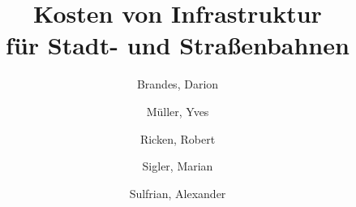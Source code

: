 \documentclass[oneside,a4paper,11pt,german]{article}
\title{Kosten von Infrastruktur \\ für Stadt- und Straßenbahnen}
\author{
  Brandes, Darion \and
  Müller, Yves \and
  Ricken, Robert \and
  Sigler, Marian \and
  Sulfrian, Alexander
}
\begin{document}
\maketitle

\begin{comment}
Gliederung:

Einleitung
* Definitionen: Kein EBO, Trennung U-Bahn/Straßenbahn (Tunnel vs. nein)

Untersuchte Projekte (Vorstellung des Projekts, Zahlen)
* U-Bahnen
* Straßenbahnen

Auswertung
* Ermittlung von Durchschnittswerten Inland getrennt U-Bahnen/Straßenbahnen
* Vergleich mit den Werten im Ausland

Zusammenfassung
\end{comment}






\end{document}
